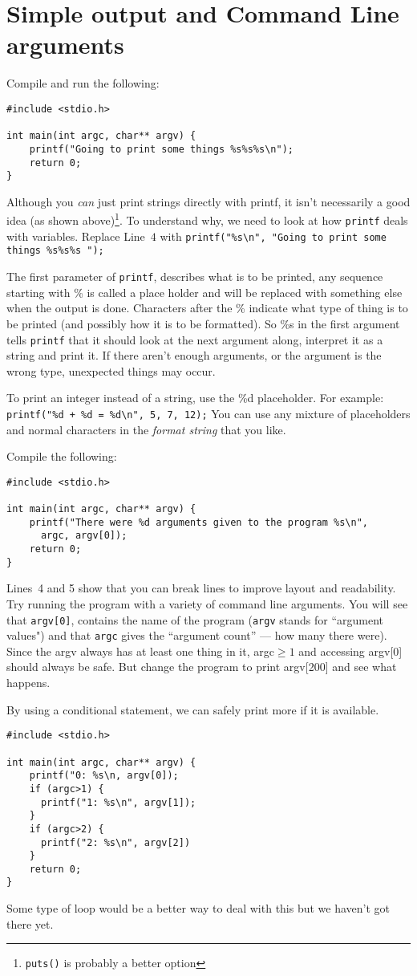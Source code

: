 
\chapter{Simple output and Command Line arguments}
\lstset{numbers=left, showstringspaces=false, frame=l}


Compile and run the following:
\begin{lstlisting}
#include <stdio.h>

int main(int argc, char** argv) {
    printf("Going to print some things %s%s%s\n");
    return 0;
}
\end{lstlisting}

Although you \emph{can} just print strings directly with printf, it isn't necessarily a good idea (as shown above)\footnote{\texttt{puts()} is probably a better option}.
To understand why, we need to look at how \texttt{printf} deals with variables.
Replace Line~$4$ with \lstinline!printf("%s\n", "Going to print some things %s%s%s ");!

The first parameter of \texttt{printf}, describes what is to be printed, any sequence starting with \% is called a place holder and will be replaced with something else when the output is done.
Characters after the \% indicate what type of thing is to be printed (and possibly how it is to be formatted).
So \%s in the first argument tells \texttt{printf} that it should look at the next argument along, interpret it as a string and print it.
If there aren't enough arguments, or the argument is the wrong type, unexpected things may occur.

To print an integer instead of a string, use the \%d placeholder.
For example: \lstinline!printf("%d + %d = %d\n", 5, 7, 12);!
You can use any mixture of placeholders and normal characters in the \emph{format string} that you like.


Compile the following:
\begin{lstlisting}
#include <stdio.h>

int main(int argc, char** argv) {
    printf("There were %d arguments given to the program %s\n",
      argc, argv[0]);
    return 0;
}
\end{lstlisting}
Lines~4 and 5 show that you can break lines to improve layout and readability.
Try running the program with a variety of command line arguments.
You will see that \texttt{argv[0]}, contains the name of the program (\texttt{argv} stands for ``argument values") and that \texttt{argc} gives the ``argument count'' --- how many there were).
Since the argv always has at least one thing in it, argc$\geq 1$ and accessing argv[0] should always be safe.
But change the program to print argv[200] and see what happens.


By using a conditional statement, we can safely print more if it is available.
\begin{lstlisting}
#include <stdio.h>

int main(int argc, char** argv) {
    printf("0: %s\n, argv[0]);
    if (argc>1) {
      printf("1: %s\n", argv[1]);    
    }
    if (argc>2) {
      printf("2: %s\n", argv[2])
    }
    return 0;
}
\end{lstlisting}
Some type of loop would be a better way to deal with this but we haven't got there yet.

